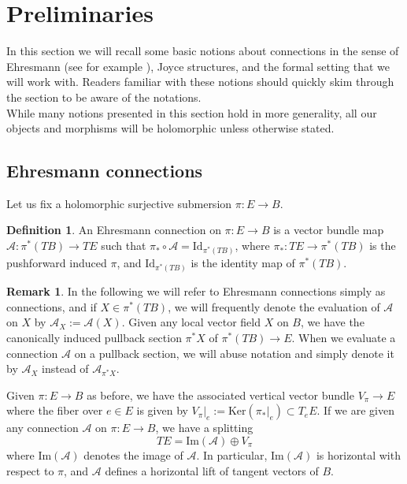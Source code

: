 \documentclass{article}
\theoremstyle{definition}
\newtheorem{definition}[theorem]{Definition}
\newtheorem{remark}[theorem]{Remark}
\numberwithin{equation}{section}
\begin{document}
\section{Preliminaries}\label{sec2}

In this section we will recall some basic notions about connections in the sense of Ehresmann (see for example \cite{ECref}), Joyce structures, and the formal setting that we will work with. Readers familiar with these notions should quickly skim through the section to be aware of the notations. \\

While many notions presented in this section hold in more generality, all our objects and morphisms will be holomorphic unless otherwise stated. 

\subsection{Ehresmann connections}
Let us fix a holomorphic surjective submersion $\pi:E\to B$. 
\begin{definition}
    An Ehresmann connection on $\pi:E\to B$ is a vector bundle map $\mathcal{A}:\pi^*(TB)\to TE$ such that $\pi_*\circ \mathcal{A}=\text{Id}_{\pi^*(TB)}$, where $\pi_*:TE\to \pi^*(TB)$ is the pushforward induced $\pi$,  and $\text{Id}_{\pi^*(TB)}$ is the identity map of $\pi^*(TB)$. 
\end{definition}
\begin{remark}\label{remconnot} In the following we will refer to Ehresmann connections simply as connections, and if $X\in \pi^*(TB)$, we will frequently denote the evaluation of $\mathcal{A}$ on $X$ by $\mathcal{A}_X:=\mathcal{A}(X)$. Given any local vector field $X$ on  $B$, we have the canonically induced pullback section $\pi^*X$ of $\pi^*(TB)\to E$. When we evaluate a connection $\mathcal{A}$ on a pullback section, we will abuse notation and simply denote it by $\mathcal{A}_{X}$ instead of $\mathcal{A}_{\pi^*X}$.\end{remark}

Given $\pi:E\to B$ as before, we have the associated vertical vector bundle $V_{\pi}\to E$ where the fiber over $e\in E$ is given by $V_{\pi}|_{e}:=\text{Ker}(\pi_*|_e)\subset T_eE$. If we are given any connection $\mathcal{A}$ on $\pi:E\to B$, we have a splitting
\begin{equation*}
    TE=\text{Im}(\mathcal{A})\oplus V_{\pi}
\end{equation*}
where $\text{Im}(\mathcal{A})$ denotes the image of $\mathcal{A}$. In particular, $\text{Im}(\mathcal{A})$ is horizontal with respect to $\pi$, and $\mathcal{A}$ defines a horizontal lift of tangent vectors of $B$. 
\end{document}
